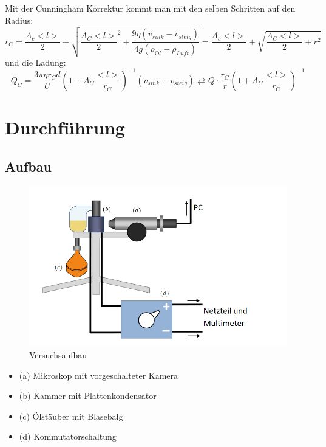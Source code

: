\documentclass{scrartcl}
\begin{document}
			Mit der Cunningham Korrektur kommt man mit den selben Schritten auf den Radius:
			\begin{equation}
				r_C = \frac{A_c <l>}{2} + \sqrt{\frac{A_C <l>}{2}^2 +\frac{9 \eta (v_{sink} - v_{steig})}{4 g (\rho_{Öl} - \rho_{Luft})}}
					= \frac{A_c <l>}{2} + \sqrt{\frac{A_C <l>}{2} + r^2}
			\end{equation}
			und die Ladung:
			\begin{equation}
				Q_C = \frac{3 \pi \eta r_C d}{U} (1 + A_C \frac{<l>}{r_C})^{-1} (v_{sink} + v_{steig})
				\rightleftarrows Q \cdot \frac{r_C}{r} (1 + A_C \frac{<l>}{r_C})^{-1} 
			\end{equation}

\section{Durchführung}
	\subsection{Aufbau}
		\begin{figure}[H]
			\centering
			\includegraphics[width=1.0\textwidth]{Versuchsaufbau.PNG}
			\caption{Versuchsaufbau}
		\end{figure}
		\begin{itemize}
			\item (a) Mikroskop mit vorgeschalteter Kamera
			\item (b) Kammer mit Plattenkondensator
			\item (c) Ölstäuber mit Blasebalg
			\item (d) Kommutatorschaltung
		\end{itemize}
\end{document}
